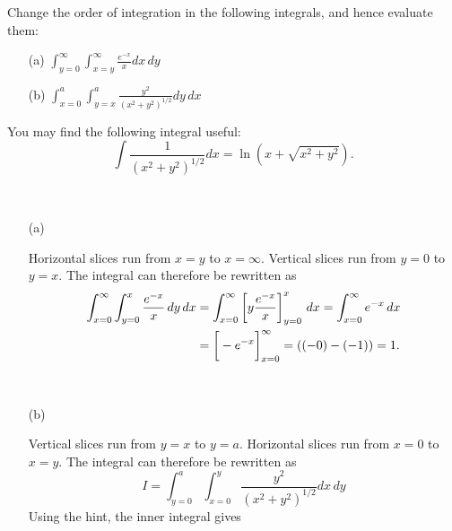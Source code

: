 \documentclass[a4paper]{amsart}
\renewenvironment{solution}{\SolutionInline}{\endSolutionInline}
\begin{document}
\begin{exercise}
 Change the order of integration in the following integrals, and hence
 evaluate them:
 \begin{itemize}
  \item[(a)] $\displaystyle \int_{y=0}^\infty\int_{x=y}^\infty\frac{e^{-x}}{x}dx\,dy$
  \item[(b)] $\displaystyle \int_{x=0}^a\int_{y=x}^a\frac{y^2}{(x^2+y^2)^{1/2}}dy\,dx$
 \end{itemize}
 You may find the following integral useful:
 \[ \int \frac{1}{(x^2+y^2)^{1/2}} dx = \ln(x+\sqrt{x^2+y^2}). \]
\end{exercise}
\begin{solution}\ \\
 \begin{itemize}
  \item[(a)]  
   \begin{minipage}[t]{11cm}
    Horizontal slices run from $x=y$ to $x=\infty$.  Vertical slices
    run from $y=0$ to $y=x$.  The integral can therefore be rewritten
    as 
    \begin{align*}
     \int_{x=0}^\infty \int_{y=0}^x \frac{e^{-x}}{x}\,dy\,dx 
      &= \int_{x=0}^\infty \CH{y\frac{e^{-x}}{x}}_{y=0}^x\,dx 
       = \int_{x=0}^\infty e^{-x}\,dx \\
      &= \CH{-e^{-x}}_{x=0}^\infty = ((-0)-(-1)) = 1.
    \end{align*}
   \end{minipage} \hfill \parbox[t]{5cm}{
   }\\[2ex]
  \item[(b)]  
   \begin{minipage}[t]{11cm}
    Vertical slices run from $y=x$ to $y=a$.  Horizontal slices run
    from $x=0$ to $x=y$.  The integral can therefore be rewritten
    as 
    \[ I = \int_{y=0}^a \int_{x=0}^y \frac{y^2}{(x^2+y^2)^{1/2}}dx\,dy
    \]
    Using the hint, the inner integral gives
    \begin{align*}

\end{align*}
\end{minipage}
\end{itemize}
\end{solution}
\end{document}
